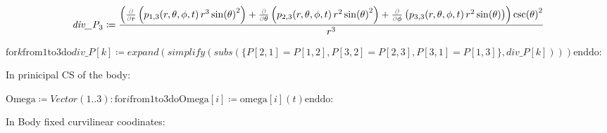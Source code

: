 \documentclass{article}
\begin{document}
\vspace{-\bigskipamount}
\begin{dmath}\label{(9)}
\textit{div\_P}_{3}\coloneqq \frac{\left(\frac{\textcolor{gray}{\partial}}{\textcolor{gray}{\partial}r}\left(p_{1,3}\! \left(r ,\theta ,\phi ,t \right) r^{3} \sin \! \left(\theta \right)^{2}\right)+\frac{\textcolor{gray}{\partial}}{\textcolor{gray}{\partial}\theta}\left(p_{2,3}\! \left(r ,\theta ,\phi ,t \right) r^{2} \sin \! \left(\theta \right)^{2}\right)+\frac{\textcolor{gray}{\partial}}{\textcolor{gray}{\partial}\phi}\left(p_{3,3}\! \left(r ,\theta ,\phi ,t \right) r^{2} \sin \! \left(\theta \right)\right)\right) \csc \! \left(\theta \right)^{2}}{r^{3}}
\end{dmath}
\begin{Maple Normal}
{$ \displaystyle \boldsymbol{\mathrm{for}}k \boldsymbol{\mathrm{from}}1\boldsymbol{\mathrm{to}}3\boldsymbol{\mathrm{do}}\textit{div\_P} [k]\coloneqq \mathit{expand} (\mathit{simplify} (\mathit{subs} ({\{P [2,1]=P [1,2],P [3,2]=P [2,3],P [3,1]=P [1,3]\}},\textit{div\_P} [k])))\boldsymbol{\mathrm{end}}\boldsymbol{\mathrm{do}}\colon  $}
\end{Maple Normal}
\begin{Maple Normal}

\end{Maple Normal}
\begin{Maple Normal}

\end{Maple Normal}
\begin{Maple Normal}
In prinicipal CS of the body:
\end{Maple Normal}
\begin{Maple Normal}

\end{Maple Normal}
\begin{Maple Normal}
{$ \displaystyle \mathrm{Omega}\coloneqq \mathit{Vector} (1..3)\colon \boldsymbol{\mathrm{for}}i \boldsymbol{\mathrm{from}}1\boldsymbol{\mathrm{to}}3\boldsymbol{\mathrm{do}}\mathrm{Omega}[i]\coloneqq \mathrm{omega}[i](t)\boldsymbol{\mathrm{end}}\boldsymbol{\mathrm{do}}\colon  $}
\end{Maple Normal}
\begin{Maple Normal}

\end{Maple Normal}
\begin{Maple Normal}
In Body fixed curvilinear coodinates:
\end{Maple Normal}
\begin{Maple Normal}

\end{Maple Normal}
\end{document}
